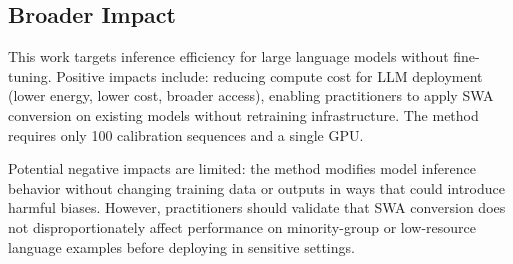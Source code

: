 \subsection{Broader Impact}

This work targets inference efficiency for large language models without fine-tuning. Positive impacts include: reducing compute cost for LLM deployment (lower energy, lower cost, broader access), enabling practitioners to apply SWA conversion on existing models without retraining infrastructure. The method requires only 100 calibration sequences and a single GPU.

Potential negative impacts are limited: the method modifies model inference behavior without changing training data or outputs in ways that could introduce harmful biases. However, practitioners should validate that SWA conversion does not disproportionately affect performance on minority-group or low-resource language examples before deploying in sensitive settings.

